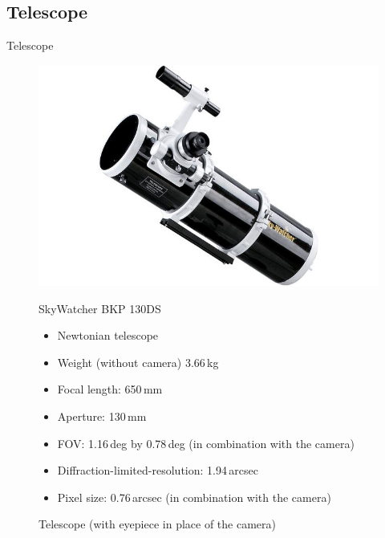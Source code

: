 \documentclass[11pt, aspectratio=169]{beamer}
\begin{document}
\subsection{Telescope} 			%
\begin{frame}{Telescope}
\begin{figure}[!htb]
    \centering
    \begin{minipage}{.5\textwidth}
        \centering
        \includegraphics[width=0.9\linewidth]{figures/images/SkyWatcher_BKP130DS.jpg}
        \caption{Telescope (with eyepiece in place of the camera)}
    \end{minipage}%
    \begin{minipage}{0.5\textwidth}
    SkyWatcher BKP 130DS
    \begin{itemize}%
        \item Newtonian telescope 
        \item Weight (without camera) 3.66\,kg
        \item Focal length: 650\,mm 
        \item Aperture: 130\,mm
        \item FOV: 1.16\,deg by 0.78\,deg (in combination with the camera)
        \item Diffraction-limited-resolution: 1.94\,arcsec
        \item Pixel size: 0.76\,arcsec (in combination with the camera)
    \end{itemize}
    \end{minipage}
\end{figure}
\end{frame}


\end{document}
